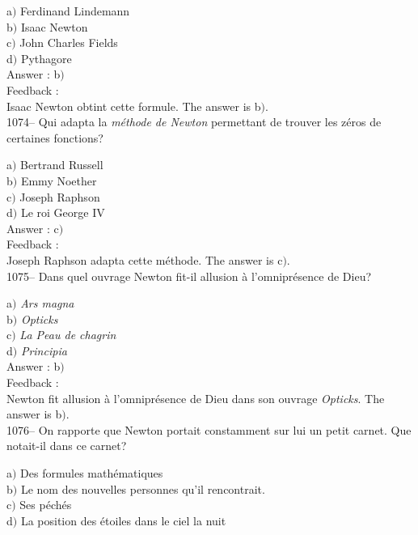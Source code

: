 ﻿\documentclass[letterpaper, 12pt]{article}
\begin{document}
a$)$ Ferdinand Lindemann \\
b$)$ Isaac Newton  \\
c$)$ John Charles Fields  \\
d$)$ Pythagore\\

Answer : b$)$\\

Feedback : \\
Isaac Newton obtint cette formule.
The answer is b$)$.\\

1074-- Qui adapta la {\sl m\'ethode de Newton} permettant de trouver
les z\'eros de certaines fonctions?

a$)$ Bertrand Russell \\
b$)$ Emmy Noether  \\
c$)$ Joseph Raphson  \\
d$)$ Le roi George IV\\

Answer : c$)$\\

Feedback : \\
Joseph Raphson adapta cette m\'ethode.
The answer is c$)$.\\

1075-- Dans quel ouvrage Newton fit-il allusion \`a l'omnipr\'esence
de Dieu?

a$)$ {\sl Ars magna} \\
b$)$ {\sl Opticks}  \\
c$)$ {\sl La Peau de chagrin}  \\
d$)$ {\sl Principia}\\

Answer : b$)$\\

Feedback : \\
Newton fit allusion \`a l'omnipr\'esence de Dieu dans son ouvrage
{\sl Opticks}.
The answer is b$)$.\\

1076-- On rapporte que Newton portait constamment sur lui un petit
carnet. Que notait-il dans ce carnet?

a$)$ Des formules math\'ematiques \\
b$)$ Le nom des nouvelles personnes qu'il rencontrait.  \\
c$)$ Ses p\'ech\'es  \\
d$)$ La position des \'etoiles dans le ciel la nuit\\
\end{document}
